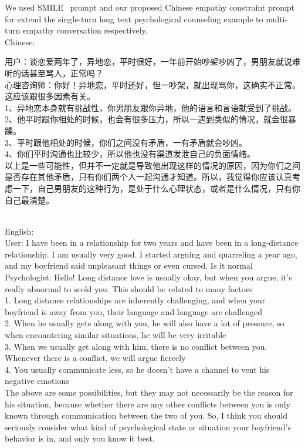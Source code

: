 \documentclass[11pt]{article}
\begin{document}
We used SMILE~\citep{qiu2023smile} prompt and our proposed Chinese empathy constraint prompt for extend the single-turn long text psychological counseling example to multi-turn empathy conversation respectively.\\
Chinese: \\
\begin{CJK}{UTF8}{gbsn}
用户：谈恋爱两年了，异地恋，平时很好，一年前开始吵架吵凶了，男朋友就说难听的话甚至骂人，正常吗？\\
心理咨询师：你好！异地恋，平时还好，但一吵架，就出现骂你，这确实不正常。这应该跟很多因素有关。\\
1、异地恋本身就有挑战性，你男朋友跟你异地，他的语言和言语就受到了挑战。\\
2、他平时跟你相处的时候，也会有很多压力，所以一遇到类似的情况，就会很暴躁。\\
3、平时跟他相处的时候，你们之间没有矛盾，一有矛盾就会吵凶。\\
4、你们平时沟通也比较少，所以他也没有渠道发泄自己的负面情绪。\\
以上是一些可能性，但并不一定就是导致他出现这样的情况的原因，因为你们之间是否存在其他矛盾，只有你们两个人一起沟通才知道。所以，我觉得你应该认真考虑一下，自己男朋友的这种行为，是处于什么心理状态，或者是什么情况，只有你自己最清楚。
\end{CJK}\\
English:\\
User: I have been in a relationship for two years and have been in a long-distance relationship. I am usually very good. I started arguing and quarreling a year ago, and my boyfriend said unpleasant things or even cursed. Is it normal\\
Psychologist: Hello! Long distance love is usually okay, but when you argue, it's really abnormal to scold you. This should be related to many factors\\
1. Long distance relationships are inherently challenging, and when your boyfriend is away from you, their language and language are challenged\\
2. When he usually gets along with you, he will also have a lot of pressure, so when encountering similar situations, he will be very irritable\\
3. When we usually get along with him, there is no conflict between you. Whenever there is a conflict, we will argue fiercely\\
4. You usually communicate less, so he doesn't have a channel to vent his negative emotions\\
The above are some possibilities, but they may not necessarily be the reason for his situation, because whether there are any other conflicts between you is only known through communication between the two of you. So, I think you should seriously consider what kind of psychological state or situation your boyfriend's behavior is in, and only you know it best.
\end{document}
